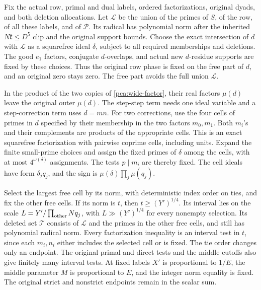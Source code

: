 Fix the actual row, primal and dual labels, ordered
factorizations, original dyads, and both deletion allocations.
Let \(\mathcal L\) be the union of the primes of \(S\), of the
row, of all these labels, and of \(\mathcal P\).
Its radical has polynomial norm after the inherited
\(N\mathfrak k\le D^5\) clip and the original support bounds.
Choose the exact intersection of \(d\) with \(\mathcal L\)
as a squarefree ideal \(\delta\), subject to all required
memberships and deletions. The good \(e_1\) factors,
conjugate \(d\)-overlaps, and actual new \(d\)-residue
supports are fixed by these choices. Thus the original
row phase is fixed on the free part of \(d\), and an
original zero stays zero. The free part avoids the full
union \(\mathcal L\).

In the product of the two copies of \eqref{pca:wide-factor},
their real factors \(\mu(d)\) leave the original outer
\(\mu(d)\). The step-step term needs one ideal variable
and a step-correction term uses \(d=mn\).
For two corrections, use the four cells of primes in \(d\)
specified by their membership in the two factors \(m_0,m_1\).
Both \(m_i\)'s and their complements are products of the
appropriate cells. This is an exact squarefree factorization
with pairwise coprime cells, including units. Expand the
finite small-prime choices and assign the fixed primes of
\(\delta\) among the cells, with at most
\(4^{\omega(\delta)}\) assignments. The tests \(p\mid m_i\)
are thereby fixed. The cell ideals have form \(\delta_j q_j\),
and the sign is \(\mu(\delta)\prod_j\mu(q_j)\).

Select the largest free cell by its norm, with deterministic
index order on ties, and fix the other free cells. If its
norm is \(t\), then \(t\ge(Y')^{1/4}\). Its interval lies
on the scale \(L=Y'/\prod_{\rm other}Nq_j\), with
\(L\gg(Y')^{1/4}\) for every nonempty selection.
Its deleted set \(\mathcal T\) consists of \(\mathcal L\)
and the primes in the other free cells, and still has
polynomial radical norm. Every factorization inequality
is an interval test in \(t\), since each \(m_i,n_i\)
either includes the selected cell or is fixed.
The tie order changes only an endpoint.
The original primal and direct tests and the middle
cutoffs also give finitely many interval tests.
At fixed labels \(X'\) is proportional to \(1/E\), the
middle parameter \(M\) is proportional to \(E\), and the
integer norm equality is fixed. The original strict and
nonstrict endpoints remain in the scalar sum.

